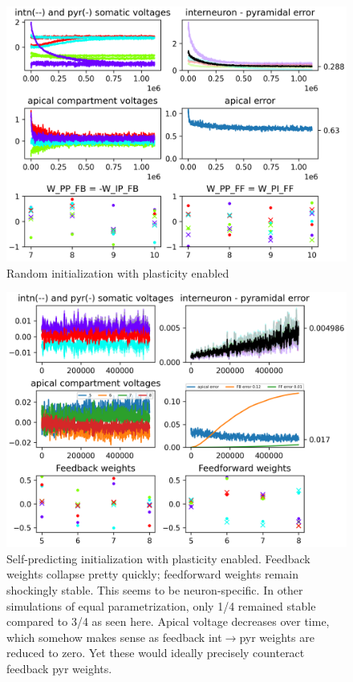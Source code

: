 \documentclass[12pt,a4paper,titlepage]{report}
\begin{document}
\begin{figure}
  \centerline{\includegraphics[width={1\linewidth}]{random_plastic.png}}
  \caption{Random initialization with plasticity enabled}
\end{figure}

\begin{figure}
  \centerline{\includegraphics[width={1\linewidth}]{weird.png}}
  \caption{Self-predicting initialization with plasticity enabled. Feedback weights collapse pretty quickly; feedforward weights remain shockingly stable. This seems to be neuron-specific. In other simulations of equal parametrization, only 1/4 remained stable compared to 3/4 as seen here. Apical voltage decreases over time, which somehow makes sense as feedback int$\rightarrow$pyr weights are reduced to zero. Yet these would ideally precisely counteract feedback pyr weights.}
\end{figure}
\end{document}
